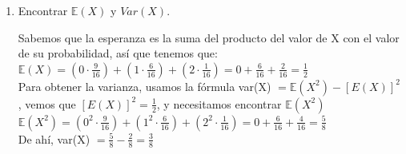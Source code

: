 \documentclass[12pt,a4paper]{report}
\begin{document}
\begin{enumerate}
{\begin{enumerate}
{				}

				\item {
					Encontrar $\mathbb{E}(X)$ y $Var(X)$.

					Sabemos que la esperanza es la suma del producto del valor de X con el valor de su probabilidad, así que tenemos que:\\

					$\mathbb{E}(X) = (0 \cdot \frac{9}{16}) + (1 \cdot \frac{6}{16}) + (2 \cdot \frac{1}{16}) = 0 + \frac{6}{16} + \frac{2}{16} = \frac{1}{2}$\\

					Para obtener la varianza, usamos la fórmula var(X) $= \mathbb{E}(X^2) - [E(X)]^2$, vemos que $[E(X)]^2 = \frac{1}{2}$, y necesitamos encontrar $\mathbb{E}(X^2)$\\

					$\mathbb{E}(X^2) =(0^2 \cdot \frac{9}{16}) + (1^2 \cdot \frac{6}{16}) + (2^2 \cdot \frac{1}{16}) = 0 + \frac{6}{16} + \frac{4}{16} = \frac{5}{8} $\\

					De ahí, var(X) $= \frac{5}{8} - \frac{2}{8} = \frac{3}{8}$
				}
			\end{enumerate}
		}


\end{enumerate}
\end{document}
